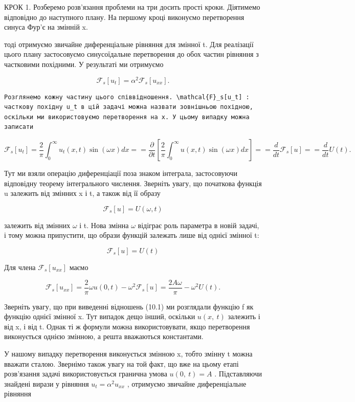 \documentclass[
  ukrainian,
]{article}
\begin{document}
КРОК 1. Розберемо розв'язання проблеми на три досить прості кроки.
Діятимемо відповідно до наступного плану. На першому кроці виконуємо
перетворення синуса Фур'є на змінній x.

тоді отримуємо звичайне диференціальне рівняння для змінної t. Для
реалізації цього плану застосовуємо синусоїдальне перетворення до обох
частин рівняння з частковими похідними. У результаті ми отримуємо

\[
\mathcal{F}_s[u_t] = \alpha^2 \mathcal{F}_s[u_{xx}].
\]

\begin{verbatim}
Розглянемо кожну частину цього співвідношення. \mathcal{F}_s[u_t] : часткову похідну u_t в цій задачі можна назвати зовнішньою похідною, оскільки ми використовуємо перетворення на x. У цьому випадку можна записати
\end{verbatim}

\[
\mathcal{F}_{s}\left[u_{t}\right] = \frac{2}{\pi} \int_{0}^{\infty} u_{t}\left(x, t\right) \sin\left(\omega x\right) dx =
= \frac{\partial}{\partial t} \left[\frac{2}{\pi} \int_{0}^{\infty} u\left(x, t\right) \sin\left(\omega x\right) dx\right] =
= \frac{d}{dt} \mathcal{F}_{s}\left[u\right] =
= \frac{d}{dt} U\left(t\right).
\]

Тут ми взяли операцію диференціації поза знаком інтеграла, застосовуючи
відповідну теорему інтегрального числення. Зверніть увагу, що початкова
функція u залежить від змінних x і t, а також від її образу

\[
\mathcal{F}_{s}[u] = U(\omega, t)
\]

залежить від змінних \(\omega\) і t. Нова змінна \(\omega\) відіграє
роль параметра в новій задачі, і тому можна припустити, що образи
функцій залежать лише від однієї змінної t:

\[
\mathcal{F}_s[u] = U(t)
\]

Для члена \(\mathcal{F}_s[u_{xx}]\) маємо

\[
\mathcal{F}_s[u_{xx}] = \frac{2}{\pi}\omega u(0,t) - \omega^2 \mathcal{F}_s[u]
= \frac{2A\omega}{\pi} - \omega^2 U(t).
\]

Зверніть увагу, що при виведенні відношень (10.1) ми розглядали функцію
f як функцію однієї змінної x. Тут випадок дещо інший, оскільки
\(u\left(x,\ t\right)\) залежить і від x, і від t. Однак ті ж формули
можна використовувати, якщо перетворення виконується однією змінною, а
решта вважаються константами.

У нашому випадку перетворення виконується змінною x, тобто змінну t
можна вважати сталою. Звернімо також увагу на той факт, що вже на цьому
етапі розв'язання задачі використовується гранична умова
\(u\left(0,\ t\right)=A\) . Підставляючи знайдені вирази у рівняння
\(u_{t}=\alpha^{2}u_{xx}\) , отримуємо звичайне диференціальне рівняння
\end{document}
